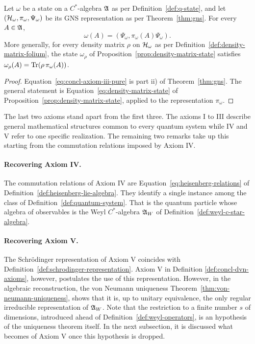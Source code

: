 	\begin{corollary}
		\label{cor:concl-axiom-iii}
		Let $\omega$ be a state on a $C^*$-algebra $\mathfrak{A}$ as per Definition~\ref{def:q-state}, and let $(\H_\omega,\pi_\omega,\Psi_\omega)$ be its GNS representation as per Theorem~\ref{thm:gns}. For every $A\in\mathfrak{A}$,
		\begin{equation}
			\omega(A)=(\Psi_\omega,\pi_\omega(A)\Psi_\omega).
			\label{eq:concl-axiom-iii-pure}
		\end{equation}
		More generally, for every density matrix $\rho$ on $\H_\omega$ as per Definition~\ref{def:density-matrix-folium}, the state $\omega_\rho$ of Proposition~\ref{prop:density-matrix-state} satisfies $\omega_\rho(A)=\Tr(\rho\,\pi_\omega(A))$.
	\end{corollary}
	\begin{proof}
		Equation~\eqref{eq:concl-axiom-iii-pure} is part ii) of Theorem~\ref{thm:gns}. The general statement is Equation~\eqref{eq:density-matrix-state} of Proposition~\ref{prop:density-matrix-state}, applied to the representation $\pi_\omega$.
	\end{proof}
	
	\noindent The last two axioms stand apart from the first three. The axioms I to III describe general mathematical structures common to every quantum system while IV and V refer to one specific realization. The remaining two remarks take up this starting from the commutation relations imposed by Axiom IV.
	
	\paragraph{Recovering Axiom IV.}\label{rem:concl-axiom-iv}
		The commutation relations of Axiom IV are Equation~\eqref{eq:heisenberg-relations} of Definition~\ref{def:heisenberg-lie-algebra}. They identify a single instance among the class of Definition~\ref{def:quantum-system}. That is the quantum particle whose algebra of observables is the Weyl $C^*$-algebra $\mathfrak{A}_W$ of Definition~\ref{def:weyl-c-star-algebra}.
	
	\paragraph{Recovering Axiom V.}\label{rem:concl-axiom-v}
		The Schr\"odinger representation of Axiom V coincides with Definition~\ref{def:schrodinger-representation}. Axiom V in Definition \ref{def:concl-dvn-axioms}, however, postulates the use of this representation. However, in the algebraic reconstruction, the von Neumann uniqueness Theorem~\ref{thm:von-neumann-uniqueness}, shows that it is, up to unitary equivalence, the only regular irreducible representation of $\mathfrak{A}_W$. Note that the restriction to a finite number $s$ of dimensions, introduced ahead of Definition~\ref{def:weyl-operators}, is an hypothesis of the uniqueness theorem itself. In the next subsection, it is discussed what becomes of Axiom V once this hypothesis is dropped.
	
